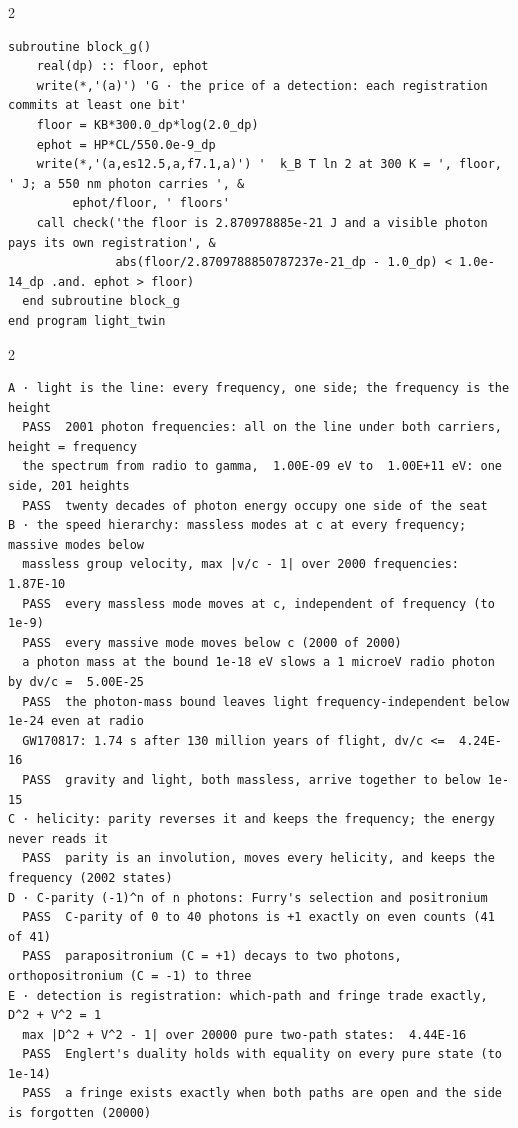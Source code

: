\documentclass[10pt]{article}
\begin{document}
\begin{multicols}{2}
\begin{Verbatim}[fontsize=\fontsize{6.0}{6.9}\selectfont,breaklines,breakanywhere,breaksymbolleft={}]
  subroutine block_g()
    real(dp) :: floor, ephot
    write(*,'(a)') 'G · the price of a detection: each registration commits at least one bit'
    floor = KB*300.0_dp*log(2.0_dp)
    ephot = HP*CL/550.0e-9_dp
    write(*,'(a,es12.5,a,f7.1,a)') '  k_B T ln 2 at 300 K = ', floor, ' J; a 550 nm photon carries ', &
         ephot/floor, ' floors'
    call check('the floor is 2.870978885e-21 J and a visible photon pays its own registration', &
               abs(floor/2.8709788850787237e-21_dp - 1.0_dp) < 1.0e-14_dp .and. ephot > floor)
  end subroutine block_g
end program light_twin
\end{Verbatim}
\end{multicols}

\begin{multicols}{2}
\begin{Verbatim}[fontsize=\fontsize{6.0}{6.9}\selectfont,breaklines,breakanywhere,breaksymbolleft={}]
A · light is the line: every frequency, one side; the frequency is the height
  PASS  2001 photon frequencies: all on the line under both carriers, height = frequency
  the spectrum from radio to gamma,  1.00E-09 eV to  1.00E+11 eV: one side, 201 heights
  PASS  twenty decades of photon energy occupy one side of the seat
B · the speed hierarchy: massless modes at c at every frequency; massive modes below
  massless group velocity, max |v/c - 1| over 2000 frequencies:  1.87E-10
  PASS  every massless mode moves at c, independent of frequency (to 1e-9)
  PASS  every massive mode moves below c (2000 of 2000)
  a photon mass at the bound 1e-18 eV slows a 1 microeV radio photon by dv/c =  5.00E-25
  PASS  the photon-mass bound leaves light frequency-independent below 1e-24 even at radio
  GW170817: 1.74 s after 130 million years of flight, dv/c <=  4.24E-16
  PASS  gravity and light, both massless, arrive together to below 1e-15
C · helicity: parity reverses it and keeps the frequency; the energy never reads it
  PASS  parity is an involution, moves every helicity, and keeps the frequency (2002 states)
D · C-parity (-1)^n of n photons: Furry's selection and positronium
  PASS  C-parity of 0 to 40 photons is +1 exactly on even counts (41 of 41)
  PASS  parapositronium (C = +1) decays to two photons, orthopositronium (C = -1) to three
E · detection is registration: which-path and fringe trade exactly, D^2 + V^2 = 1
  max |D^2 + V^2 - 1| over 20000 pure two-path states:  4.44E-16
  PASS  Englert's duality holds with equality on every pure state (to 1e-14)
  PASS  a fringe exists exactly when both paths are open and the side is forgotten (20000)

\end{Verbatim}
\end{multicols}
\end{document}
